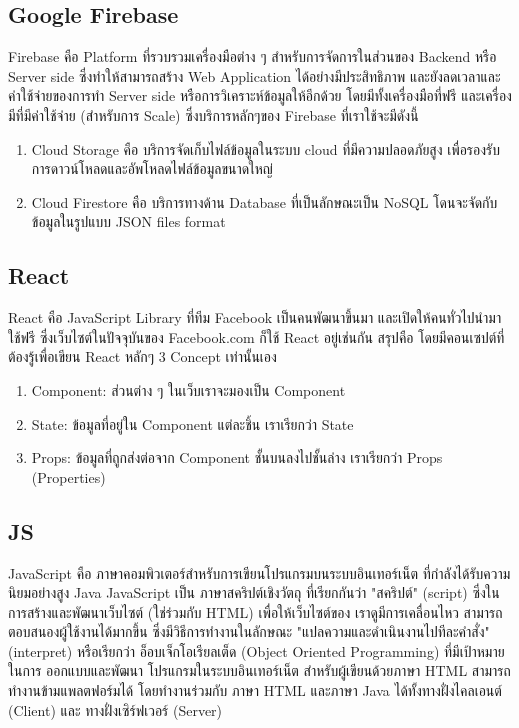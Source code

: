 \subsection{Google Firebase}
Firebase คือ Platform ที่รวบรวมเครื่องมือต่าง ๆ สำหรับการจัดการในส่วนของ Backend หรือ Server side
ซึ่งทำให้สามารถสร้าง Web Application ได้อย่างมีประสิทธิภาพ และยังลดเวลาและค่าใช้จ่ายของการทำ Server side
หรือการวิเคราะห์ข้อมูลให้อีกด้วย โดยมีทั้งเครื่องมือที่ฟรี และเครื่องมีที่มีค่าใช้จ่าย (สำหรับการ Scale) ซึ่งบริการหลักๆของ
Firebase ที่เราใช้จะมีดังนี้

\begin{enumerate}
  \item Cloud Storage คือ บริการจัดเก็บไฟล์ข้อมูลในระบบ cloud ที่มีความปลอดภัยสูง เพื่อรองรับการดาวน์โหลดและอัพโหลดไฟล์ข้อมูลขนาดใหญ่
  \item Cloud Firestore คือ บริการทางด้าน Database ที่เป็นลักษณะเป็น NoSQL โดนจะจัดกับข้อมูลในรูปแบบ JSON files format
\end{enumerate}

\subsection{React}
React คือ JavaScript Library ที่ทีม Facebook เป็นคนพัฒนาขึ้นมา และเปิดให้คนทั่วไปนำมาใช้ฟรี ซึ่งเว็บไซต์ในปัจจุบันของ
Facebook.com ก็ใช้ React อยู่เช่นกัน สรุปคือ โดยมีคอนเซปต์ที่ต้องรู้เพื่อเขียน React หลักๆ 3 Concept เท่านั้นเอง

\begin{enumerate}
  \item Component: ส่วนต่าง ๆ ในเว็บเราจะมองเป็น Component
  \item State: ข้อมูลที่อยู่ใน Component แต่ละชิ้น เราเรียกว่า State
  \item Props: ข้อมูลที่ถูกส่งต่อจาก Component ชั้นบนลงไปชั้นล่าง เราเรียกว่า Props (Properties)
\end{enumerate}


\subsection{JS}
JavaScript คือ ภาษาคอมพิวเตอร์สำหรับการเขียนโปรแกรมบนระบบอินเทอร์เน็ต ที่กำลังได้รับความนิยมอย่างสูง Java JavaScript
เป็น ภาษาสคริปต์เชิงวัตถุ ที่เรียกกันว่า "สคริปต์" (script) ซึ่งในการสร้างและพัฒนาเว็บไซต์ (ใช่ร่วมกับ HTML) เพื่อให้เว็บไซต์ของ
เราดูมีการเคลื่อนไหว สามารถตอบสนองผู้ใช้งานได้มากขึ้น ซึ่งมีวิธีการทำงานในลักษณะ "แปลความและดำเนินงานไปทีละคำสั่ง"
(interpret) หรือเรียกว่า อ็อบเจ็กโอเรียลเต็ด (Object Oriented Programming) ที่มีเป้าหมายในการ ออกแบบและพัฒนา
โปรแกรมในระบบอินเทอร์เน็ต สำหรับผู้เขียนด้วยภาษา HTML สามารถทำงานข้ามแพลตฟอร์มได้ โดยทำงานร่วมกับ ภาษา HTML และภาษา
Java ได้ทั้งทางฝั่งไคลเอนต์ (Client) และ ทางฝั่งเซิร์ฟเวอร์ (Server)

